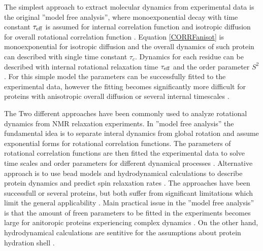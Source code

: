 \documentclass[pre,aps,floatfix,authordate1-4,twocolumn]{revtex4-1}
\begin{document}
The simplest approach to extract molecular dynamics from experimental
data is the original ''model free analysis'', where monoexponential
decay with time constant $\tau_{\rm eff}$ is assumed for internal correlation
function and isotropic diffusion for overall rotational correlation function \cite{??}.
Equation \ref{CORRFanisot} is monoexponential for isotropic diffusion
and the overall dynamics of such protein can described with single time constant $\tau_c$.
Dynamics for each residue can be described with internal rotational relaxation 
time $\tau_{\rm eff}$ and the order parameter $S^2$. For this simple model
the parameters can be successfully fitted to the experimental data,
however the fitting becomes significantly more difficult for proteins 
with anisotropic overall diffusion or several internal timescales \cite{dosset00,luginbuhl97}.



The 
Two different approaches have been commonly used to analyze
rotational dynamics from NMR relaxation experiments. In
''model free analysis'' the fundamental idea is to separate
interal dynamics from global rotation and assume exponential
forms for rotational correlation functions. The parameters of
rotational correlation functions are then fitted the experimental
data to solve time scales and order parameters for different dynamical
processes \cite{dosset00,??}. Alternative approach is to use bead models and hydrodynamical
calculations to describe protein dynamics and predict spin relaxation rates \cite{torre00}.
The approaches have been successfull or several proteins, but both suffer
from significant limitations which limit the general applicability \cite{??}.
Main practical issue in the ''model free analysis'' is that the amount of
freen parameters to be fitted in the experiments becomes large for anitoropic
proteins experiencing complex dynamics \cite{??}. On the other hand,
hydrodynamical calculations are sentitive for the assumptions about
protein hydration shell \cite{torre00}.
\end{document}
